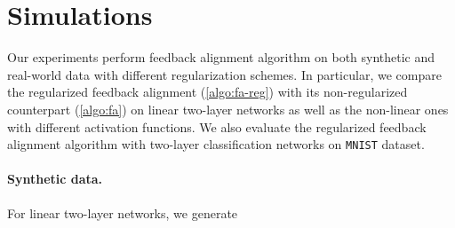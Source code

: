 \section{Simulations}

Our experiments perform feedback alignment algorithm on both synthetic and real-world data with different regularization schemes. In particular, we compare the regularized feedback alignment (\cref{algo:fa-reg}) with its non-regularized counterpart (\cref{algo:fa}) on linear two-layer networks as well as the non-linear ones with different activation functions. We also evaluate the regularized feedback alignment algorithm with two-layer classification networks on \texttt{MNIST} dataset.

\paragraph{Synthetic data.}

For linear two-layer networks, we generate

